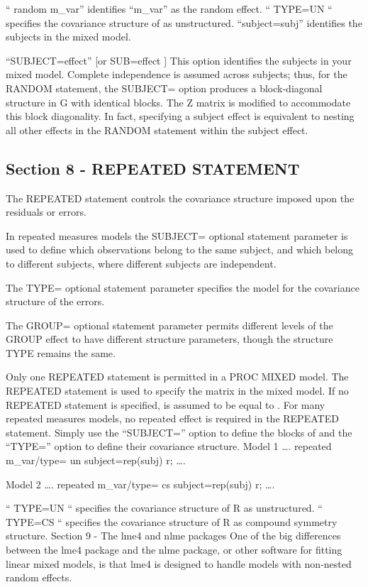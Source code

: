 “ random m_var” identifies “m_var” as the random effect.
“ TYPE=UN “ specifies the covariance structure of   as unstructured.
“subject=subj” identifies the subjects in the mixed model.

“SUBJECT=effect” 		[or SUB=effect ]
This option identifies the subjects in your mixed model. Complete independence is assumed across subjects; thus, for the RANDOM statement, the SUBJECT= option produces a block-diagonal structure in G with identical blocks. 
The Z matrix is modified to accommodate this block diagonality. 
In fact, specifying a subject effect is equivalent to nesting all other effects in the RANDOM statement within the subject effect. 







\subsection*{Section 8 - REPEATED STATEMENT}

The REPEATED statement controls the covariance structure imposed upon the residuals or errors.

 In repeated measures models the SUBJECT= optional statement parameter is used to define which observations belong to the same subject, and which belong to different subjects, where different subjects are independent. 

The TYPE= optional statement parameter specifies the model for the covariance structure of the errors. 

The GROUP= optional statement parameter permits different levels of the GROUP effect to have different structure parameters, though the structure TYPE remains the same. 

Only one REPEATED statement is permitted in a PROC MIXED model.
The REPEATED statement is used to specify the   matrix in the mixed model. 
If no REPEATED statement is specified,  is assumed to be equal to  .
For many repeated measures models, no repeated effect is required in the REPEATED statement. Simply use the “SUBJECT=” option to define the blocks of   and the “TYPE=” option to define their covariance structure.
Model 1
….
repeated m_var/type= un subject=rep(subj) r;
….

Model 2
….
repeated m_var/type= cs subject=rep(subj) r;
….

“ TYPE=UN “ specifies the covariance structure of R as unstructured.
“ TYPE=CS “ specifies the covariance structure of R as compound symmetry structure.
Section 9 - The lme4 and nlme packages
One of the big differences between the lme4 package and the nlme package, or other software for fitting linear mixed models, is that lme4 is designed to handle models with non-nested random effects.


